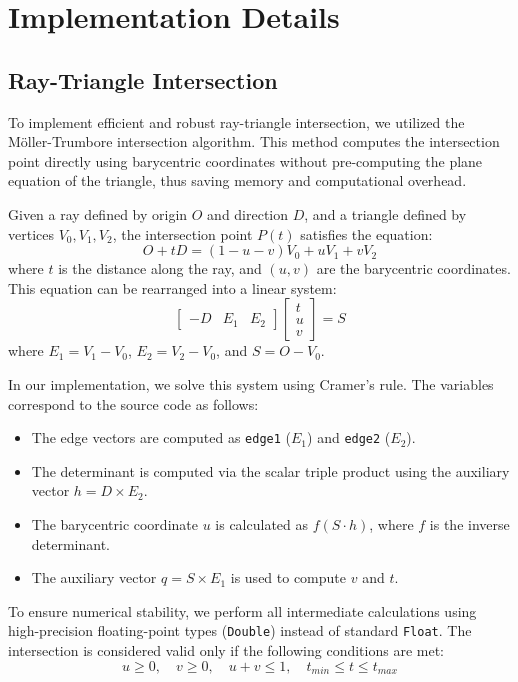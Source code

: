 \documentclass[acmtog]{acmart}
\begin{document}
\section{Implementation Details}
\subsection{Ray-Triangle Intersection}
To implement efficient and robust ray-triangle intersection, we utilized the Möller-Trumbore intersection algorithm. This method computes the intersection point directly using barycentric coordinates without pre-computing the plane equation of the triangle, thus saving memory and computational overhead.

Given a ray defined by origin $O$ and direction $D$, and a triangle defined by vertices $V_0, V_1, V_2$, the intersection point $P(t)$ satisfies the equation:
\begin{equation}
    O + tD = (1 - u - v)V_0 + uV_1 + vV_2
\end{equation}
where $t$ is the distance along the ray, and $(u, v)$ are the barycentric coordinates. This equation can be rearranged into a linear system:
\begin{equation}
    \begin{bmatrix} -D & E_1 & E_2 \end{bmatrix} \begin{bmatrix} t \\ u \\ v \end{bmatrix} = S
\end{equation}
where $E_1 = V_1 - V_0$, $E_2 = V_2 - V_0$, and $S = O - V_0$. 

In our implementation, we solve this system using Cramer's rule. The variables correspond to the source code as follows:
\begin{itemize}
    \item The edge vectors are computed as \texttt{edge1} ($E_1$) and \texttt{edge2} ($E_2$).
    \item The determinant is computed via the scalar triple product using the auxiliary vector $h = D \times E_2$.
    \item The barycentric coordinate $u$ is calculated as $f (S \cdot h)$, where $f$ is the inverse determinant.
    \item The auxiliary vector $q = S \times E_1$ is used to compute $v$ and $t$.
\end{itemize}

To ensure numerical stability, we perform all intermediate calculations using high-precision floating-point types (\texttt{Double}) instead of standard \texttt{Float}. The intersection is considered valid only if the following conditions are met:
\begin{equation}
    u \ge 0, \quad v \ge 0, \quad u + v \le 1, \quad t_{min} \le t \le t_{max}
\end{equation}
\end{document}

